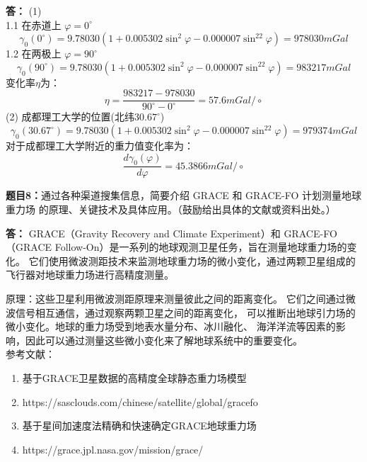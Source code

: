\documentclass[12pt,a4paper]{article}
\begin{document}
\vspace{5pt}
\noindent
{\bf 答：}
(1) \\
1.1 在赤道上 $\varphi = 0^\circ$
\begin{equation}
    \gamma_0(0^\circ)=9.78030\left(1+
    0.005302\sin^2\varphi-0.000007\sin^22\varphi\right) = 978030mGal
\end{equation}
1.2 在两极上 $\varphi = 90^\circ$
\begin{equation}
    \gamma_0(90^\circ)=9.78030\left(1+
    0.005302\sin^2\varphi-0.000007\sin^22\varphi\right) = 983217mGal
\end{equation}
变化率$\eta$为：
\begin{equation}
    \eta = \frac{983217 - 978030}{90^\circ - 0^\circ} = 57.6mGal / \circ
\end{equation}
(2) 成都理工大学的位置(北纬$30.67^\circ$)
\begin{equation}
    \gamma_0(30.67^\circ)=9.78030\left(1+
    0.005302\sin^2\varphi-0.000007\sin^22\varphi\right) = 979374mGal
\end{equation}
对于成都理工大学附近的重力值变化率为：
\begin{equation}
    \frac{d \gamma_0(\varphi)}{d \varphi} =  45.3866 mGal / \circ
\end{equation}

\vspace{10pt}
\noindent
{\bf 题目8：}通过各种渠道搜集信息，简要介绍 GRACE 和 GRACE-FO 计划测量地球重力场
的原理、关键技术及具体应用。（鼓励给出具体的文献或资料出处。）

\vspace{5pt}
\noindent
{\bf 答：} GRACE（Gravity Recovery and Climate Experiment）和
GRACE-FO（GRACE Follow-On）是一系列的地球观测卫星任务，旨在测量地球重力场的变化。
它们使用微波测距技术来监测地球重力场的微小变化，通过两颗卫星组成的飞行器对地球重力场进行高精度测量。

原理：这些卫星利用微波测距原理来测量彼此之间的距离变化。
它们之间通过微波信号相互通信，通过观察两颗卫星之间的距离变化，
可以推断出地球引力场的微小变化。地球的重力场受到地表水量分布、冰川融化、
海洋洋流等因素的影响，因此可以通过测量这些微小变化来了解地球系统中的重要变化。\\
参考文献：
\begin{enumerate}[label=(\arabic*)] %
    \item 基于GRACE卫星数据的高精度全球静态重力场模型
    \item https://sasclouds.com/chinese/satellite/global/gracefo
    \item 基于星间加速度法精确和快速确定GRACE地球重力场
    \item https://grace.jpl.nasa.gov/mission/grace/
\end{enumerate}
\end{document}
